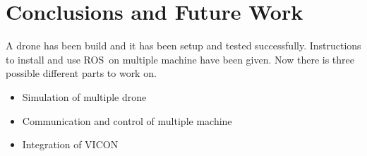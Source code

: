 \chapter{Conclusions and Future Work}

A drone has been build and it has been setup and tested successfully. Instructions to install and use ROS on multiple machine have been given. Now there is three possible different parts to work on.
\begin{itemize}
  \item Simulation of multiple drone
  \item Communication and control of multiple machine
  \item Integration of VICON
\end{itemize}
